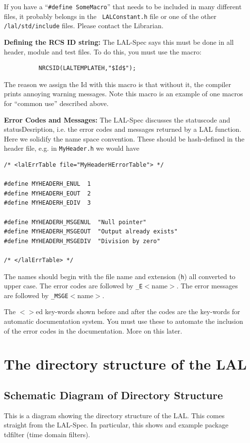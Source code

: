 \documentclass[oneside]{book}
\begin{document}
If you have a ``{\texttt {\#define SomeMacro}}'' that needs to be
included in many different files, it probably belongs in the {\tt
LALConstant.h} file or one of the other {\tt /lal/std/include} files.
Please contact the Librarian.

\bigskip

{\noindent \bf Defining the RCS ID string:}  The LAL-Spec says this
must be done in all header, module and test files. To do this, you
must use the macro:
\begin{verbatim}
          NRCSID(LALTEMPLATEH,"$Id$");
\end{verbatim}
\noindent The reason we assign the Id with this macro is that without it,
the compiler prints annoying warning messages. Note this macro is an
example of one macros for ``common use'' described above.

\bigskip

{\noindent \bf Error Codes and Messages:} The LAL-Spec discusses the
statuscode and statusDesription, i.e. the error codes and  messages
returned by a LAL function. Here we solidify the name space
convention. These should be hash-defined in the header file, e.g. in
{\tt MyHeader.h} we would have
\begin{verbatim}
/* <lalErrTable file="MyHeaderHErrorTable"> */

#define MYHEADERH_ENUL  1 
#define MYHEADERH_EOUT  2
#define MYHEADERH_EDIV  3

#define MYHEADERH_MSGENUL  "Null pointer"
#define MYHEADERH_MSGEOUT  "Output already exists"
#define MYHEADERH_MSGEDIV  "Division by zero"

/* </lalErrTable> */
\end{verbatim}
\noindent The names should begin with the file name and extension ({\tt h})
all converted to upper case. The error codes are followed by
{\tt \_E}$<$name$>$. The error messages are followed by
{\tt \_MSGE}$<$name$>$.

The $<>$ed key-words shown before and after the codes are the
key-words for automatic documentation system.  You must use these to
automate the inclusion of the error codes in the documentation.  More
on this later.

\chapter{The directory structure of the LAL}
\label{c:DirectoryStructure}

\newpage
\section{Schematic Diagram of Directory Structure}
This is a diagram showing the   directory structure of the LAL.
This comes straight from the LAL-Spec. In particular, this shows
and example package tdfilter  (time domain filters).
\end{document}
